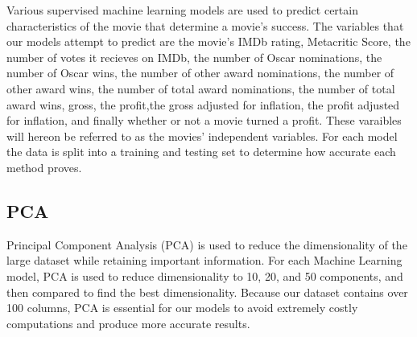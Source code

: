 \documentclass[11pt]{article}
\begin{document}
Various supervised machine learning models are used to predict certain
characteristics of the movie that determine a movie's success. The
variables that our models attempt to predict are the movie's IMDb
rating, Metacritic Score, the number of votes it recieves on IMDb, the
number of Oscar nominations, the number of Oscar wins, the number of
other award nominations, the number of other award wins, the number of
total award nominations, the number of total award wins, gross, the
profit,the gross adjusted for inflation, the profit adjusted for
inflation, and finally whether or not a movie turned a profit. These
varaibles will hereon be referred to as the movies' independent
variables. For each model the data is split into a training and testing
set to determine how accurate each method proves.

\hypertarget{pca}{%
	\subsection{PCA}\label{pca}}

Principal Component Analysis (PCA) is used to reduce the dimensionality of the large dataset while retaining important information. For each Machine Learning model, PCA is used to reduce dimensionality to 10, 20, and 50 components, and then compared to find the best dimensionality. Because our dataset contains over 100 columns, PCA is essential for our models to avoid extremely costly computations and produce more accurate results.
\end{document}
